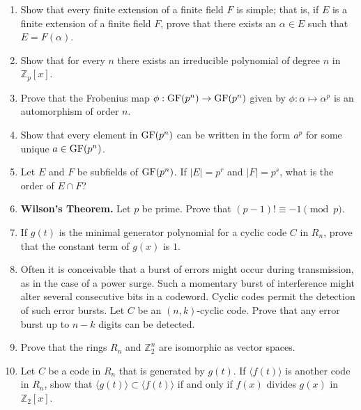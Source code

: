{\begin{enumerate}
\item
Show that every finite extension of a finite field $F$ is simple;
that is, if $E$ is a finite extension of a finite field $F$, prove
that there exists an $\alpha \in E$ such that $E = F( \alpha )$.


\item
Show that for every $n$ there exists an irreducible polynomial of 
degree $n$ in~${\mathbb Z}_p[x]$.



\item \label{exercise:finite:frobeniusmap}
Prove that the {\bfi Frobenius map} $\phi : {\rm
GF}(p^n) \rightarrow {\rm GF}(p^n)$ given by $\phi : \alpha \mapsto
\alpha^p$ is an automorphism of order $n$. 


\item
Show that every element in ${\rm GF}(p^n)$ can be written in the form
$a^p$ for some unique $a \in {\rm GF}(p^n)$.


\item
Let $E$ and $F$ be subfields of ${\rm GF}(p^n)$. If $|E| = p^r$ and
$|F| = p^s$, what is the order of $E \cap F$? 


\item
{\bf Wilson's Theorem.}
Let $p$ be prime.  Prove that $(p-1)! \equiv -1 \pmod{p}$. 


\item
If $g(t)$ is the minimal generator polynomial for a cyclic code $C$ in
$R_n$, prove that the constant term of $g(x)$ is $1$.


\item
Often it is conceivable that a burst of errors might occur during
transmission, as in the case of a power surge.  Such a momentary burst
of interference might alter several consecutive bits in a codeword.
Cyclic codes permit the detection of such error bursts. Let $C$ be an
$(n,k)$-cyclic code. Prove that any error burst up to $n-k$ digits can
be detected.  


\item
Prove that the rings $R_n$ and ${\mathbb Z}_2^n$ are isomorphic as vector
spaces. 


\item
Let $C$ be a code in $R_n$ that is generated by $g(t)$. If $\langle
f(t) \rangle$ is another code in $R_n$, show that $\langle g(t) \rangle
\subset \langle f(t) \rangle$ if and only if $f(x)$ divides $g(x)$ in
${\mathbb Z}_2[x]$.



\end{enumerate}}
